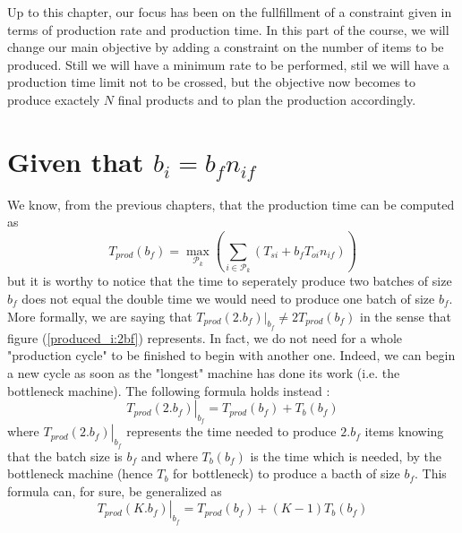 Up to this chapter, our focus has been on the fullfillment of a constraint given in terms of production rate and production time. In this part of the course, we will change our main objective by adding a constraint on the number of items to be produced. Still we will have a minimum rate to be performed, stil we will have a production time limit not to be crossed, but the objective now becomes to produce exactely $N$ final products and to plan the production accordingly. 

\section{Given that $b_i = b_fn_{if}$}

We know, from the previous chapters, that the production time can be computed as \[ T_{prod}(b_f) = \max_{\mathcal P_k}\left( \sum_{i\in\mathcal P_k}(T_{si} + b_fT_{oi}n_{if}) \right) \] but it is worthy to notice that the time to seperately produce two batches of size $b_f$ does not equal the double time we would need to produce one batch of size $b_f$. More formally, we are saying that $T_{prod}(2.b_f)|_{b_f}\ne 2T_{prod}(b_f)$ in the sense that figure (\ref{produced_i:2bf}) represents. In fact, we do not need for a whole "production cycle" to be finished to begin with another one. Indeed, we can begin a new cycle as soon as the "longest" machine has done its work (i.e. the bottleneck machine). The following formula holds instead : \[ \left. T_{prod}(2.b_f) \right|_{b_f} = T_{prod}(b_f) + T_b(b_f) \] where $\left. T_{prod}(2.b_f) \right|_{b_f}$ represents the time needed to produce $2.b_f$ items knowing that the batch size is $b_f$ and where $T_b(b_f)$ is the time which is needed, by the bottleneck machine (hence $T_b$ for bottleneck) to produce a bacth of size $b_f$. This formula can, for sure, be generalized as \begin{equation} \left. T_{prod}(K.b_f) \right|_{b_f} = T_{prod}(b_f) + (K-1)T_b(b_f) \label{produced_i:tprod} \end{equation}

